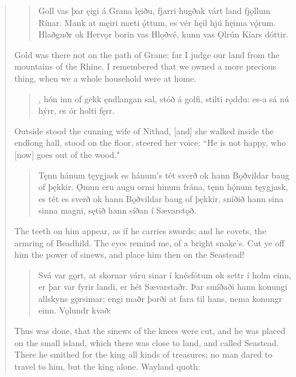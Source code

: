 \begin{verse}
\begin{verse}
\bva Goll vas þar ęigi \hld á Grana lęiðu,
fjarri hugðak várt land \hld fjǫllum Rínar.
Mank at męiri \hld mæti ǫ́ttum,
es vér hęil hjú \hld hęima vǫ́rum. \\%
Hlaðguðr ok Hervǫr \hld borin vas Hlǫðvé,
kunn vas Ǫlrún \hld Kíars dóttir.  \\%
\end{verse}

\bvb Gold was there not on the path of Grane; far I judge our land from the mountains of the Rhine. I remembered that we owned a more precious thing, when we a whole household were at home.

\begin{verse}
,
hón inn of gekk \hld ęndlangan sal,
stóð á golfi, \hld stilti rǫddu:
es-a sá nú hýrr, \hld es ór holti fęrr. \\%
\end{verse}

\bvb Outside stood the cunning wife of Nithad, [and] she walked inside the endlong hall, stood on the floor, steered her voice: “He is not happy, who [now] goes out of the wood."

\begin{verse}
\bva Tęnn hánum tęygjask \hld es hánum's tét sverð
ok hann Bǫðvildar \hld baug of þękkir.
Ǫ́mun eru augu \hld ormi hinum frána,
tęnn hǫ́num tęygjask, \hld es tét es sverð
ok hann Bǫðvildar \hld baug of þękkir,
sníðið hann sina \hld sinna magni,
sętið hann síðan \hld í Sævarstǫð. \\%
\end{verse}

\bvb The teeth on him appear, as if he carries swords; and he covets, the armring of Beadhild. The eyes remind me, of a bright snake's. Cut ye off him the power of sinews, and place him then on the Seastead!

\begin{verse}
\bva Svá var gǫrt, at skornar váru sinar í knésfótum ok settr í holm einn, er þar var fyrir landi, er hét Sævarstaðr. Þar smíðaði hann konungi allskyns gǫrsimar; engi maðr þorði at fara til hans, nema konungr einn. Vǫlundr kvað: \\%
\end{verse}

\bvb Thus was done, that the sinews of the knees were cut, and he was placed on the small island, which there was close to land, and called Seastead. There he smithed for the king all kinds of treasures; no man dared to travel to him, but the king alone. Wayland quoth: \\


\end{verse}
